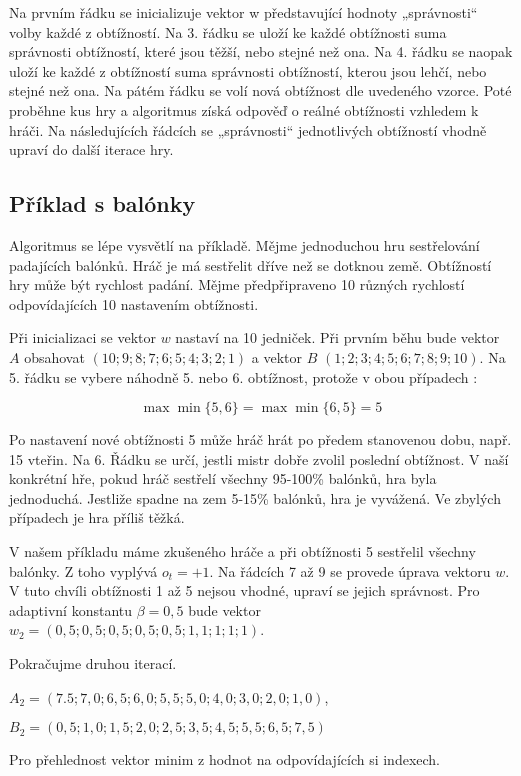Na prvním řádku se inicializuje vektor w představující hodnoty „správnosti“ volby každé z obtížností. Na 3. řádku se uloží ke každé obtížnosti suma správnosti obtížností, které jsou těžší, nebo stejné než ona. Na 4. řádku se naopak uloží ke každé z obtížností suma správnosti obtížností, kterou jsou lehčí, nebo stejné než ona. Na pátém řádku se volí nová obtížnost dle uvedeného vzorce. Poté proběhne kus hry a algoritmus získá odpověď o reálné obtížnosti vzhledem k hráči. Na následujících řádcích se „správnosti“ jednotlivých obtížností vhodně upraví do další iterace hry.

\subsection{Příklad s balónky}

Algoritmus se lépe vysvětlí na příkladě.\cite{23posm2} Mějme jednoduchou hru sestřelování padajících balónků. Hráč je má sestřelit dříve než se dotknou země. Obtížností hry může být rychlost padání. Mějme předpřipraveno 10 různých rychlostí odpovídajících 10 nastavením obtížnosti.

Při inicializaci se vektor $w$ nastaví na 10 jedniček. Při prvním běhu bude vektor $A$ obsahovat $(10; 9; 8; 7; 6; 5; 4; 3; 2; 1)$ a vektor $B$ $(1; 2; 3; 4; 5; 6; 7; 8; 9; 10)$. Na 5. řádku se vybere náhodně 5. nebo 6. obtížnost, protože v obou případech :


	\[
	\max{\min{\{5, 6\}}} = \max{\min{\{6, 5\}}} = 5
\]

Po nastavení nové obtížnosti 5 může hráč hrát po předem stanovenou dobu, např. 15 vteřin. Na 6. Řádku se určí, jestli mistr dobře zvolil poslední obtížnost. V naší konkrétní hře, pokud hráč sestřelí všechny 95-100\% balónků, hra byla jednoduchá. Jestliže spadne na zem 5-15\% balónků, hra je vyvážená. Ve zbylých případech je hra příliš těžká.

V našem příkladu máme zkušeného hráče a při obtížnosti 5 sestřelil všechny balónky. Z toho vyplývá $o_t=+1$. Na řádcích 7 až 9 se provede úprava vektoru $w$. V tuto chvíli obtížnosti 1 až 5 nejsou vhodné, upraví se jejich správnost. Pro adaptivní konstantu $\beta=0,5$ bude vektor $w_2=(0,5;0,5;0,5;0,5;0,5;1,1;1;1;1)$.

Pokračujme druhou iterací. 

$A_2=(7.5;7,0;6,5;6,0;5,5;5,0;4,0;3,0;2,0;1,0)$, 

$B_2=(0,5;1,0;1,5;2,0;2,5;3,5;4,5;5,5;6,5;7,5)$

Pro přehlednost vektor minim z hodnot na odpovídajících si indexech.

